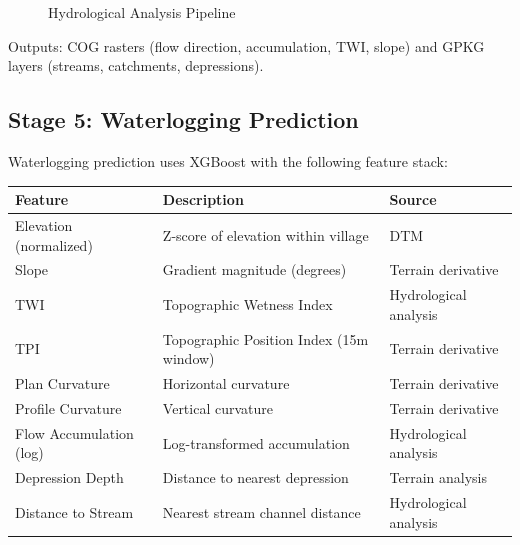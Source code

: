 \documentclass[a4paper,12pt]{article}
\begin{document}
\bigskip

\begin{figure}[htbp]
	\centering
	\caption{Hydrological Analysis Pipeline}
\end{figure}

Outputs: COG rasters (flow direction, accumulation, TWI, slope) and GPKG layers (streams, catchments, depressions).

\subsection{Stage 5: Waterlogging Prediction}

Waterlogging prediction uses XGBoost with the following feature stack:

\begin{longtable}{lll}
	\toprule
	\textbf{Feature}        & \textbf{Description}                    & \textbf{Source}       \\
	\midrule
	Elevation (normalized)  & Z-score of elevation within village     & DTM                   \\
	Slope                   & Gradient magnitude (degrees)            & Terrain derivative    \\
	TWI                     & Topographic Wetness Index               & Hydrological analysis \\
	TPI                     & Topographic Position Index (15m window) & Terrain derivative    \\
	Plan Curvature          & Horizontal curvature                    & Terrain derivative    \\
	Profile Curvature       & Vertical curvature                      & Terrain derivative    \\
	Flow Accumulation (log) & Log-transformed accumulation            & Hydrological analysis \\
	Depression Depth        & Distance to nearest depression          & Terrain analysis      \\
	Distance to Stream      & Nearest stream channel distance         & Hydrological analysis \\
	\bottomrule
\end{longtable}
\end{document}
